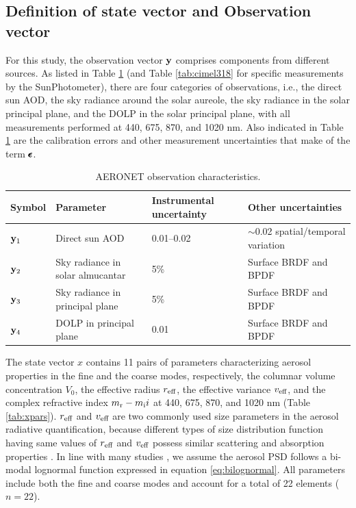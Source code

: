 \subsection{Definition of state vector and Observation vector}
\label{subsec:xy}

For this study, the observation vector $\mathbf{y}$ comprises components from
different sources. As listed in Table \ref{tab:ypars} (and Table
\ref{tab:cimel318} for specific measurements by the SunPhotometer), there are 
four categories of observations, i.e., the direct sun AOD, the sky 
radiance around the solar aureole, the sky radiance in the solar 
principal plane, and the DOLP in the solar principal plane, with 
all measurements performed at 440, 675, 870, and 1020 nm. 
Also indicated in Table \ref{tab:ypars} are the calibration 
errors and other measurement uncertainties that make of the term $\pmb{\epsilon}$. 

\begin{table}[t]
  \centering
  \small
  \caption{AERONET observation characteristics.}
  \label{tab:ypars}
  \begin{tabular}{p{3em} p{13em} p{5em} p{13em} }
    \toprule
       Symbol & Parameter & Instrumental uncertainty & Other
uncertainties \\
    \midrule
       $\mathbf{y}_1$ & Direct sun AOD & 0.01--0.02 & $\sim$0.02
spatial/temporal variation \\ 
       $\mathbf{y}_2$ & Sky radiance in solar almucantar & 5\% & Surface BRDF
and BPDF \\
       $\mathbf{y}_3$ & Sky radiance in principal plane & 5\% & Surface BRDF
and BPDF \\
       $\mathbf{y}_4$ & DOLP in principal plane & 0.01 & Surface BRDF
and BPDF \\
    \bottomrule
  \end{tabular}
\end{table}

The state vector $x$ contains 11 pairs of parameters characterizing
aerosol properties in the fine and the coarse modes, respectively, the
columnar volume concentration $V_0$, the effective radius $r_\text{eff}$, the
effective variance $v_\text{eff}$, and the complex refractive index 
$m_\text{r}-m_\text{i} i$ at 440, 675, 870, and 1020 nm (Table \ref{tab:xpars}). $r_\text{eff}$ and 
$v_\text{eff}$ are two commonly used size parameters in the aerosol
radiative quantification, because different types of size distribution
function having same values of $r_\text{eff}$ and $v_\text{eff}$ possess similar
scattering and absorption properties \citep{Hansen74}. In line
with many studies \citep{Schuster06, Hasekamp05a, Hasekamp07,
Mishchenko07, Waquet09}, we assume the
aerosol PSD follows a bi-modal lognormal function expressed in equation
\eqref{eq:bilognormal}. All parameters include both the fine and coarse
modes and account for a total of 22 elements ($n=22$). 

